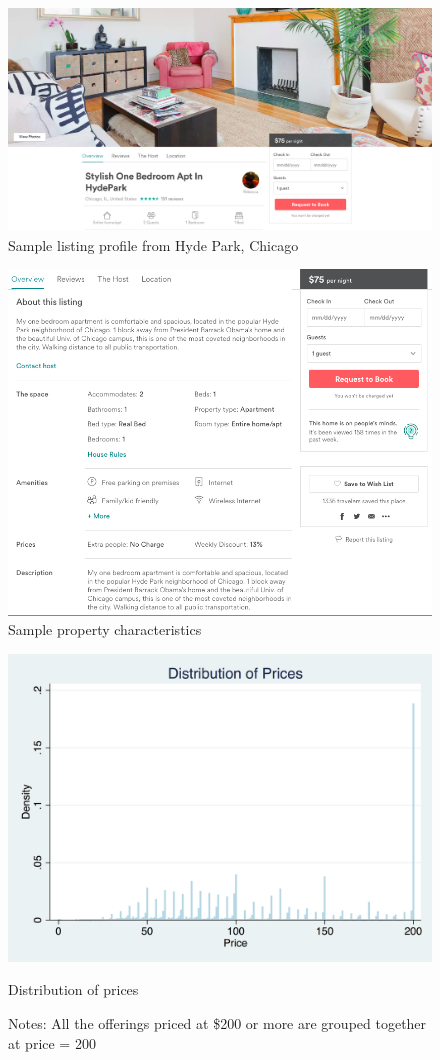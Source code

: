 \singlespacing

\begin{figure}[h]
	\includegraphics[width=1\textwidth]{tables/sample1-cover}
	\caption{Sample listing profile from Hyde Park, Chicago}
\end{figure}
\begin{figure}
	\includegraphics[width=1\textwidth]{tables/sample2-property}
	\caption{Sample property characteristics}
\end{figure}

\begin{figure}\centering
	\includegraphics[width=.8\textwidth]{figures/price_dist-DISC-200}
	\caption{Distribution of prices}
	\caption*{Notes: All the offerings priced at \$200 or more are grouped together at price = 200}
\end{figure}

